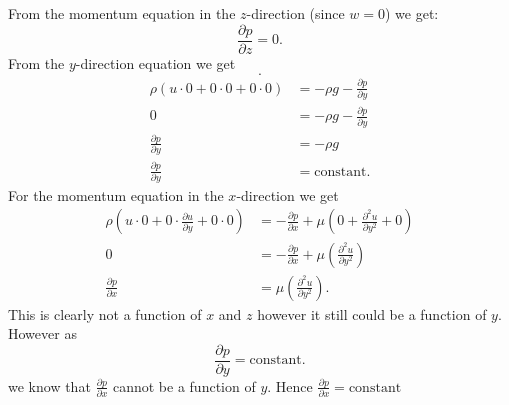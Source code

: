 From the momentum equation in the $z$-direction (since $w = 0$) we get:
\[ 
\frac{\partial p}{\partial z}  = 0
.\]
From the $y$-direction equation we get
\[ 
.\]
\begin{align*}
  \rho \left( u \cdot 0 + 0 \cdot 0 + 0\cdot 0 \right) &= - \rho g - \frac{\partial p}{\partial y}  \\
  0 &= - \rho g - \frac{\partial p}{\partial y}  \\
  \frac{\partial p}{\partial y} &= - \rho g \\
  \frac{\partial p}{\partial y} &= \mathrm{constant}
.\end{align*}
For the momentum equation in the $x$-direction we get
\begin{align*}
  \rho \left( u \cdot 0 + 0 \cdot \frac{\partial u}{\partial y} + 0 \cdot 0 \right) &= - \frac{\partial p}{\partial x} + \mu \left( 0 + \frac{\partial ^2 u}{\partial y^2} + 0 \right) \\
  0 &= - \frac{\partial p}{\partial x} + \mu \left( \frac{\partial ^2 u}{\partial y^2}  \right) \\
  \frac{\partial p}{\partial x} &= \mu \left( \frac{\partial ^2 u}{\partial y^2}  \right)
.\end{align*}
This is clearly not a function of $x$ and $z$ however it still could be a function of $y$. However as
\[ 
\frac{\partial p}{\partial y} = \mathrm{constant}
.\]
we know that $\frac{\partial p}{\partial x} $ cannot be a function of $y$. Hence $\frac{\partial p}{\partial x} = \mathrm{constant}$
